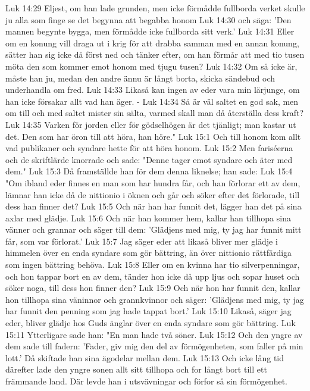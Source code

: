 Luk 14:29  Eljest, om han lade grunden, men icke förmådde fullborda verket skulle ju alla som finge se det begynna att begabba honom
Luk 14:30  och säga: 'Den mannen begynte bygga, men förmådde icke fullborda sitt verk.'
Luk 14:31  Eller om en konung vill draga ut i krig för att drabba samman med en annan konung, sätter han sig icke då först ned och tänker efter, om han förmår att med tio tusen möta den som kommer emot honom med tjugu tusen?
Luk 14:32  Om så icke är, måste han ju, medan den andre ännu är långt borta, skicka sändebud och underhandla om fred.
Luk 14:33  Likaså kan ingen av eder vara min lärjunge, om han icke försakar allt vad han äger. -
Luk 14:34  Så är väl saltet en god sak, men om till och med saltet mister sin sälta, varmed skall man då återställa dess kraft?
Luk 14:35  Varken för jorden eller för gödselhögen är det tjänligt; man kastar ut det. Den som har öron till att höra, han höre."
Luk 15:1  Och till honom kom allt vad publikaner och syndare hette för att höra honom.
Luk 15:2  Men fariséerna och de skriftlärde knorrade och sade: "Denne tager emot syndare och äter med dem."
Luk 15:3  Då framställde han för dem denna liknelse; han sade:
Luk 15:4  "Om ibland eder finnes en man som har hundra får, och han förlorar ett av dem, lämnar han icke då de nittionio i öknen och går och söker efter det förlorade, till dess han finner det?
Luk 15:5  Och när han har funnit det, lägger han det på sina axlar med glädje.
Luk 15:6  Och när han kommer hem, kallar han tillhopa sina vänner och grannar och säger till dem: 'Glädjens med mig, ty jag har funnit mitt får, som var förlorat.'
Luk 15:7  Jag säger eder att likaså bliver mer glädje i himmelen över en enda syndare som gör bättring, än över nittionio rättfärdiga som ingen bättring behöva.
Luk 15:8  Eller om en kvinna har tio silverpenningar, och hon tappar bort en av dem, tänder hon icke då upp ljus och sopar huset och söker noga, till dess hon finner den?
Luk 15:9  Och när hon har funnit den, kallar hon tillhopa sina väninnor och grannkvinnor och säger: 'Glädjens med mig, ty jag har funnit den penning som jag hade tappat bort.'
Luk 15:10  Likaså, säger jag eder, bliver glädje hos Guds änglar över en enda syndare som gör bättring.
Luk 15:11  Ytterligare sade han: "En man hade två söner.
Luk 15:12  Och den yngre av dem sade till fadern: 'Fader, giv mig den del av förmögenheten, som faller på min lott.' Då skiftade han sina ägodelar mellan dem.
Luk 15:13  Och icke lång tid därefter lade den yngre sonen allt sitt tillhopa och for långt bort till ett främmande land. Där levde han i utsvävningar och förfor så sin förmögenhet.

